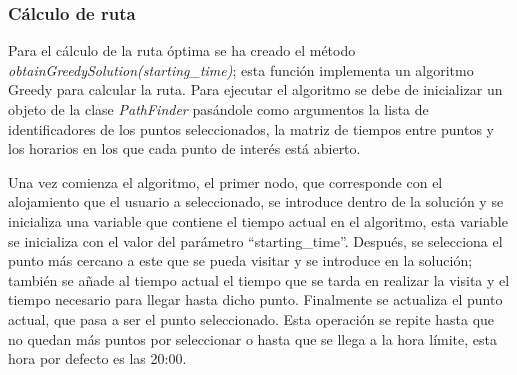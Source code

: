 \subsubsection{Cálculo de ruta}
Para el cálculo de la ruta óptima se ha creado el método \textit{obtainGreedySolution(starting\_time)}; esta función implementa un algoritmo Greedy para calcular la ruta. Para ejecutar el algoritmo se debe de inicializar un objeto de la clase \textit{PathFinder} pasándole como argumentos la lista de identificadores de los puntos seleccionados, la matriz de tiempos entre puntos y los horarios en los que cada punto de interés está abierto.\newline

Una vez comienza el algoritmo, el primer nodo, que corresponde con el alojamiento que el usuario a seleccionado, se introduce dentro de la solución y se inicializa una variable que contiene el tiempo actual en el algoritmo, esta variable se inicializa con el valor del parámetro \enquote{starting\_time}. Después, se selecciona el punto más cercano a este que se pueda visitar y se introduce en la solución; también se añade al tiempo actual el tiempo que se tarda en realizar la visita y el tiempo necesario para llegar hasta dicho punto. Finalmente se actualiza el punto actual, que pasa a ser el punto seleccionado. Esta operación se repite hasta que no quedan más puntos por seleccionar o hasta que se llega a la hora límite, esta hora por defecto es las 20:00.\newline


